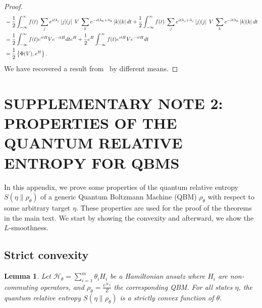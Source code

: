 \documentclass[
    reprint,
    aps,
    prx,
    longbibliography
]{revtex4-2}
\newtheorem{lemma}{Lemma}
\begin{document}
\begin{proof}
\begin{align}
\begin{split}
    &= \frac{1}{2} \int_{-\infty}^{\infty} f(t) \; \sum_{j} e^{it\lambda_j} \dyad{j} \; V \; \sum_{k} e^{-it\lambda_k + \lambda_k} \dyad{k} dt + \frac{1}{2}\int_{-\infty}^{\infty} f(t) \; \sum_{j} e^{it\lambda_j + \lambda_j} \dyad{j} \; V \; \sum_{k} e^{-it\lambda_k} \dyad{k} dt \\
    &= \frac{1}{2} \int_{-\infty}^{\infty} f(t) e^{itH} V e^{-itH} dt e^{H} + \frac{1}{2} e^H \int_{-\infty}^{\infty} f(t) e^{itH} V e^{-itH} dt  \\
    &= \frac{1}{2} \left\{ \Phi(V) , e^H\right\} .
\end{split}
\end{align}
We have recovered a result from~\cite{Hastings_2007} by different means. 
\end{proof}

\clearpage

\section*{\MakeUppercase{Supplementary Note 2: Properties of the quantum relative entropy for QBMs}}

In this appendix, we prove some properties of the quantum relative entropy $S(\eta \|\rho_\theta)$ of a generic Quantum Boltzmann Machine (QBM) $\rho_\theta$ with respect to some arbitrary target $\eta$. These properties are used for the proof of the theorems in the main text. We start by showing the convexity and afterward, we show the $L$-smoothness. 

\subsection*{Strict convexity} 

\begin{lemma}
Let $\mathcal{H}_\theta = \sum_{i=1}^m \theta_{i} H_{i}$ be a Hamiltonian ansatz where $H_i$ are non-commuting operators, and $\rho_\theta = \frac{e^{\mathcal{H}_\theta}}{Z}$ the corresponding QBM. For all states $\eta$, the quantum relative entropy $S(\eta\|\rho_\theta)$ is a strictly convex function of $\theta$. 
\end{lemma}
\end{document}
